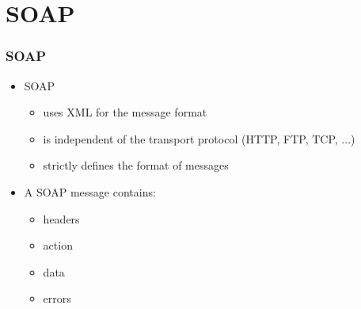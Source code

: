 \documentclass{beamer}
\begin{document}
\section{SOAP} 
\begin{frame}[fragile]\frametitle{SOAP} 

  \begin{itemize}
    \item SOAP
    \begin{itemize}
      \item uses XML for the message format
      \item is independent of the transport protocol (HTTP, FTP, TCP, ...)
      \item strictly defines the format of messages
    \end{itemize}
    
    \item A SOAP message contains:
    \begin{itemize}
      \item headers
      \item action
      \item data
      \item errors
    \end{itemize}
    
  \end{itemize}

\end{frame}
\end{document}
